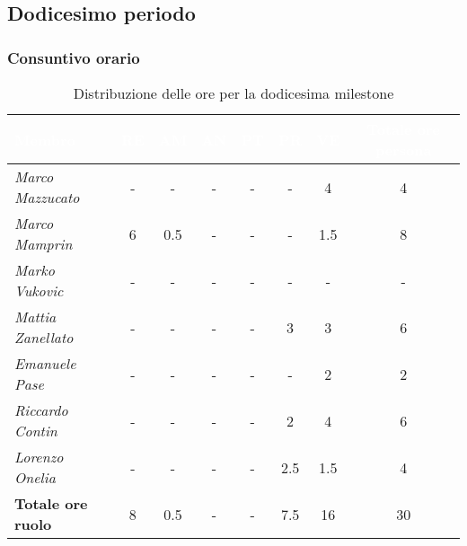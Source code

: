 \subsection{Dodicesimo periodo}
\subsubsection{Consuntivo orario}
\begin{table}[H]
    \renewcommand\arraystretch{1.5}
    \small
    \centering
        \begin{tabular}{|l|c|c|c|c|c|c|c|}
            \hline
            \rowcolor[HTML]{036400}
            \textcolor{white}{\textbf{Membro}} & \multicolumn{1}{c|}{\textcolor{white}{\textbf{RE}}} & \multicolumn{1}{c|}{\textcolor{white}{\textbf{AM}}} & \multicolumn{1}{c|}{\textcolor{white}{\textbf{AN}}} & \multicolumn{1}{c|}{\textcolor{white}{\textbf{PT}}} & \multicolumn{1}{c|}{\textcolor{white}{\textbf{PR}}} & \multicolumn{1}{c|}{\textcolor{white}{\textbf{VE}}} & \multicolumn{1}{c|}{\textcolor{white}{\textbf{Totale ore persona}}} \\ \hline
            \rowcolor[HTML]{EFEFEF}\textit{Marco Mazzucato}  & -         & -        & -          & -        & -        & 4            & 4     \\ \hline
            \rowcolor[HTML]{C0C0C0}\textit{Marco Mamprin}    & 6         & 0.5      & -          & -        & -        & 1.5          & 8   \\ \hline
            \rowcolor[HTML]{EFEFEF}\textit{Marko Vukovic}    & -         & -        & -          & -        & -        & -            & -           \\ \hline
            \rowcolor[HTML]{C0C0C0}\textit{Mattia Zanellato} & -         & -        & -          & -        & 3        & 3            & 6       \\ \hline
            \rowcolor[HTML]{EFEFEF}\textit{Emanuele Pase}    & -         & -        & -          & -        & -        & 2            & 2      \\ \hline
            \rowcolor[HTML]{C0C0C0}\textit{Riccardo Contin}  & -         & -        & -          & -        & 2        & 4            & 6           \\ \hline
            \rowcolor[HTML]{EFEFEF}\textit{Lorenzo Onelia}   & -         & -        & -          & -        & 2.5      & 1.5          & 4        \\ \hline
            \rowcolor[HTML]{C0C0C0}\textbf{Totale ore ruolo} & 8         & 0.5      & -          & -        & 7.5      & 16           & 30   \\ \hline
        \end{tabular}
    \caption{Distribuzione delle ore per la dodicesima milestone}
\end{table}

